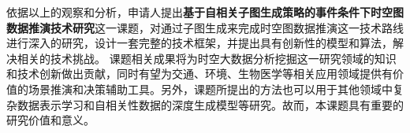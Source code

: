 \documentclass[12pt,UTF8,AutoFakeBold=2,a4paper]{ctexart} %
\begin{document}
依据以上的观察和分析，申请人提出\textbf{{基于自相关子图生成策略的事件条件下时空图数据推演技术研究}}这一课题，对通过子图生成来完成时空图数据推演这一技术路线进行深入的研究，设计一套完整的技术框架，并提出具有创新性的模型和算法，解决相关的技术挑战。%
%
课题相关成果将为时空大数据分析挖掘这一研究领域的知识和技术创新做出贡献，同时有望为交通、环境、生物医学等相关应用领域提供有价值的场景推演和决策辅助工具。另外，课题所提出的方法也可以用于其他领域中复杂数据表示学习和自相关性数据的深度生成模型等研究。故而，本课题具有重要的研究价值和意义。
\end{document}
